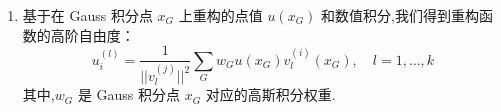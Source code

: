\documentclass{book}
\begin{document}
\begin{enumerate}[label={{\bf Step \arabic*}:}]
\begin{enumerate}[label={\bf Step 1.\arabic*.}]
              \item 我们基于平滑度指示器计算非线性权重,
                    \begin{equation}
                        \omega_{j}=\frac{\bar{\omega}_{j}}{\sum_{l} \bar{\omega}_{l}}, \quad \bar{\omega}_{j}=\frac{\gamma_{j}}{\left(\varepsilon+\beta_{j}\right)^{2}},
                    \end{equation}
                    其中,$\gamma_j$ 是在 {\bf Step 1.2.} 中确定的线性权重,$\varepsilon$ 是一个很小的数,用于避免分母为零.在本文中,我们在所有计算中使用 $\varepsilon=10^{-6}$.最终的 WENO 近似为：
                    \begin{equation}
                        u_{(x_G)} \approx \sum_{j=0}^{k} \omega_{j} p_{j}\left(x_{G}\right)
                    \end{equation}
          \end{enumerate}
    \item 基于在 Gauss 积分点 $x_G$ 上重构的点值 $u(x_G)$ 和数值积分,我们得到重构函数的高阶自由度：
          \begin{equation}
              u_{i}^{(l)}=\frac{1}{||v_{l}^{(j)}||^2} \sum_{G} w_{G} u\left(x_{G}\right) v_{l}^{(i)}\left(x_{G}\right), \quad l=1, \ldots, k
          \end{equation}
          其中,$w_{G}$ 是 Gauss 积分点 $x_{G}$ 对应的高斯积分权重.
\end{enumerate}
\end{document}
